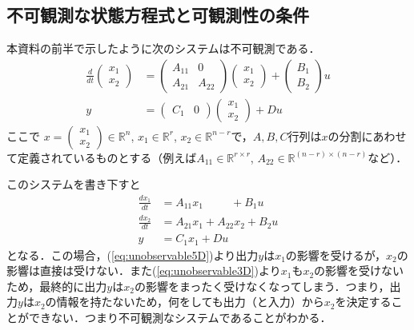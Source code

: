 \subsection{不可観測な状態方程式と可観測性の条件}

本資料の前半で示したように次のシステムは不可観測である．
\begin{align}
 \frac{d}{dt}
  \left(\begin{array}{c}
         {x}_1 \\
	 {x}_2 
	\end{array}\right)
  &=
  \left(\begin{array}{cc}
         {A}_{11} & 0 \\
	     {A}_{21} & {A}_{22}
	\end{array}\right)
  \left(\begin{array}{c}
         {x}_1 \\
	 {x}_2 
	\end{array}\right)
  +
  \left(\begin{array}{c}
         {B}_1 \\
	 {B}_2
	\end{array}\right)
  u 
\label{eq:unobservable1D} \\
 y &=
  \left(\begin{array}{cc}
         {C}_1 & 0
	\end{array}\right)
  \left(\begin{array}{c}
         {x}_1 \\
	 {x}_2 
	\end{array}\right)
  + D u
\label{eq:unobservable2D}
\end{align}
ここで
$x = \left(\begin{array}{c} {x}_1 \\ {x}_2 \end{array}\right) \in {\mathbb R}^n$, 
$x_1 \in {\mathbb R}^r$, $x_2 \in {\mathbb R}^{n-r}$で，$A,B,C$行列は$x$の分割にあわせて定義されているものとする（例えば$A_{11} \in {\mathbb R}^{r \times r}$, $A_{22} \in {\mathbb R}^{(n-r) \times (n-r)}$など）．

このシステムを書き下すと
\begin{align}
 \frac{dx_1}{dt} &= A_{11} x_1 \ \ \ \ \ \ \ \ \ \ \ + B_1 u
\label{eq:unobservable3D} \\
 \frac{dx_2}{dt} &= A_{21} x_1 + A_{22} x_2 + B_2 u
\label{eq:unobservable4D} \\
 y & = C_1 x_1 + Du
\label{eq:unobservable5D}
\end{align}
となる．この場合，(\ref{eq:unobservable5D})より出力$y$は$x_1$の影響を受けるが，$x_2$の影響は直接は受けない．また(\ref{eq:unobservable3D})より$x_1$も$x_2$の影響を受けないため，最終的に出力$y$は$x_2$の影響をまったく受けなくなってしまう．つまり，出力$y$は$x_2$の情報を持たないため，何をしても出力（と入力）から$x_2$を決定することができない．つまり不可観測なシステムであることがわかる．

